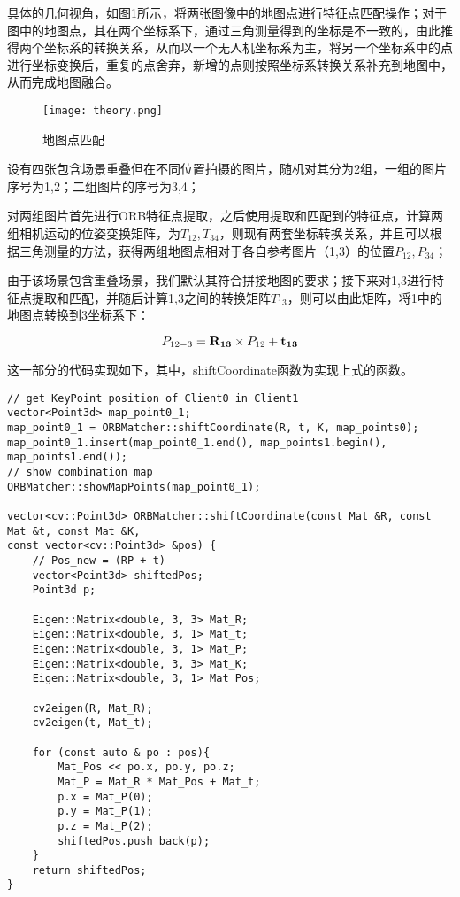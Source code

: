 具体的几何视角，如图\ref{fig14}所示，将两张图像中的地图点进行特征点匹配操作；对于图中的地图点，其在两个坐标系下，通过三角测量得到的坐标是不一致的，由此推得两个坐标系的转换关系，从而以一个无人机坐标系为主，将另一个坐标系中的点进行坐标变换后，重复的点舍弃，新增的点则按照坐标系转换关系补充到地图中，从而完成地图融合。

\begin{figure}[!ht]
	\centering
	\texttt{[image: theory.png]}
	\caption{地图点匹配}
	\label{fig14}
\end{figure}

设有四张包含场景重叠但在不同位置拍摄的图片，随机对其分为2组，一组的图片序号为1,2；二组图片的序号为3,4；

对两组图片首先进行ORB特征点提取，之后使用提取和匹配到的特征点，计算两组相机运动的位姿变换矩阵，为$T_{12},T_{34}$，则现有两套坐标转换关系，并且可以根据三角测量的方法，获得两组地图点相对于各自参考图片（1,3）的位置$P_{12},P_{34}$；

由于该场景包含重叠场景，我们默认其符合拼接地图的要求；接下来对1,3进行特征点提取和匹配，并随后计算1,3之间的转换矩阵$T_{13}$，则可以由此矩阵，将1中的地图点转换到3坐标系下：

\begin{equation}
P_{12-3}={\bf R_{13}} \times P_{12} + \bf{t_{13}}
\end{equation}

这一部分的代码实现如下，其中，shiftCoordinate函数为实现上式的函数。

\begin{verbatim}
// get KeyPoint position of Client0 in Client1
vector<Point3d> map_point0_1;
map_point0_1 = ORBMatcher::shiftCoordinate(R, t, K, map_points0);
map_point0_1.insert(map_point0_1.end(), map_points1.begin(), map_points1.end());
// show combination map
ORBMatcher::showMapPoints(map_point0_1);

vector<cv::Point3d> ORBMatcher::shiftCoordinate(const Mat &R, const Mat &t, const Mat &K,
const vector<cv::Point3d> &pos) {
    // Pos_new = (RP + t)
    vector<Point3d> shiftedPos;
    Point3d p;

    Eigen::Matrix<double, 3, 3> Mat_R;
    Eigen::Matrix<double, 3, 1> Mat_t;
    Eigen::Matrix<double, 3, 1> Mat_P;
    Eigen::Matrix<double, 3, 3> Mat_K;
    Eigen::Matrix<double, 3, 1> Mat_Pos;

    cv2eigen(R, Mat_R);
    cv2eigen(t, Mat_t);

    for (const auto & po : pos){
        Mat_Pos << po.x, po.y, po.z;
        Mat_P = Mat_R * Mat_Pos + Mat_t;
        p.x = Mat_P(0);
        p.y = Mat_P(1);
        p.z = Mat_P(2);
        shiftedPos.push_back(p);
    }
    return shiftedPos;
}
\end{verbatim}

